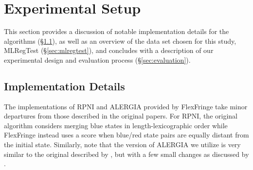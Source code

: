 \documentclass[twoside,11pt]{article}
\begin{document}
\section{Experimental Setup}
This section provides a discussion of notable implementation details for the algorithms (\S\ref{sec:impl-details}), as well as an overview of the data set chosen for this study, MLRegTest (\S\ref{sec:mlregtest}), and concludes with a description of our experimental design and evaluation process (\S\ref{sec:evaluation}).


\subsection{Implementation Details} \label{sec:impl-details}
The implementations of RPNI and ALERGIA provided by FlexFringe take minor departures from those described in the original papers. For RPNI, the original algorithm considers merging blue states in length-lexicographic order while FlexFringe instead uses a score when blue/red state pairs are equally distant from the initial state. Similarly, note that the version of ALERGIA we utilize is very similar to the original described by \citet{CarrascoOncina1994}, but with a few small changes as discussed by \citet[\S4.1]{flexfringe}.

\end{document}
